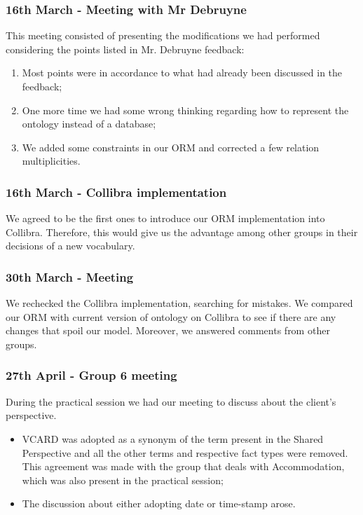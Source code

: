 \documentclass[a4paper,10pt]{article}
\begin{document}
\subsubsection*{16th March - Meeting with Mr Debruyne}
This meeting consisted of presenting the modifications we had performed considering the points listed in Mr. Debruyne feedback:
\begin{enumerate}
  \item Most points were in accordance to what had already been discussed in the feedback;
  \item One more time we had some wrong thinking regarding how to represent the ontology instead of a database;
  \item We added some constraints in our ORM and corrected a few relation multiplicities.
\end{enumerate}

\subsubsection*{16th March - Collibra implementation}
We agreed to be the first ones to introduce our ORM implementation into Collibra. Therefore, this would give us the advantage among other groups in their decisions of a new vocabulary.

\subsubsection*{30th March - Meeting}
We rechecked the Collibra implementation, searching for mistakes. We compared our ORM with current version of ontology on Collibra to see if there are any changes that spoil our model. Moreover, we answered comments from other groups.

\subsubsection*{27th April - Group 6 meeting}
During the practical session we had our meeting to discuss about the client's perspective.
\begin{itemize}
  \item VCARD was adopted as a synonym of the term present in the Shared Perspective and all the other terms and respective fact types were removed. This agreement was made with the group that deals with Accommodation, which was also present in the practical session;
  \item The discussion about either adopting date or time-stamp arose.
\end{itemize}
\end{document}
